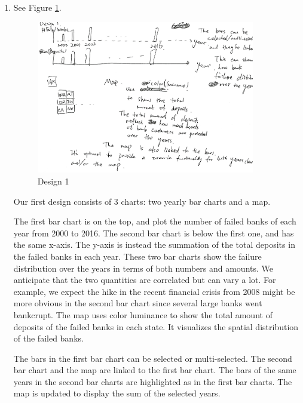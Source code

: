 \begin{enumerate}
    \item See Figure \ref{fig:design_1}.

        \begin{figure}[!h]
            \centering
            \includegraphics[width=0.9\textwidth]{fig/design_1}
            \caption{Design 1}
            \label{fig:design_1}
        \end{figure}

        Our first design consists of 3 charts: two yearly bar charts and a
        map. 
        
        The first bar chart is on the top, and plot the number of failed banks
        of each year from 2000 to 2016. The second bar chart is below the
        first one, and has the same x-axis. The y-axis is instead the
        summation of the total deposits in the failed banks in each year.
        These two bar charts show the failure distribution over the years in
        terms of both numbers and amounts. We anticipate that the two
        quantities are correlated but can vary a lot. For example, we expect
        the hike in the recent financial crisis from 2008 might be more
        obvious in the second bar chart since several large banks went
        bankcrupt.  The map uses color luminance to show the total amount of
        deposits of the failed banks in each state. It visualizes the spatial
        distribution of the failed banks.

        The bars in the first bar chart can be selected or multi-selected. The
        second bar chart and the map are linked to the first bar chart. The
        bars of the same years in the second bar charts are highlighted as in the
        first bar charts. The map is updated to display the sum of the selected years.


\end{enumerate}
